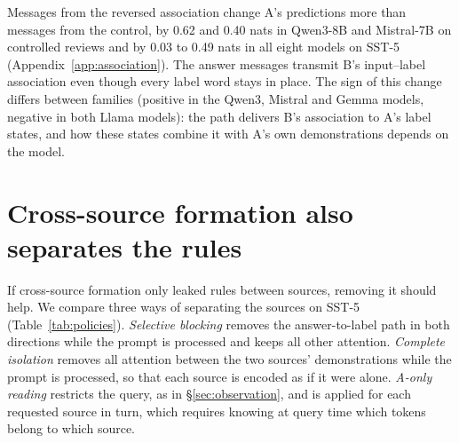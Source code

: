 \documentclass[11pt]{article}
\begin{document}
Messages from the reversed association change A's predictions more than messages from the control, by 0.62 and 0.40 nats in Qwen3-8B and Mistral-7B on controlled reviews and by 0.03 to 0.49 nats in all eight models on SST-5 (Appendix~\ref{app:association}).
The answer messages transmit B's input--label association even though every label word stays in place.
The sign of this change differs between families (positive in the Qwen3, Mistral and Gemma models, negative in both Llama models): the path delivers B's association to A's label states, and how these states combine it with A's own demonstrations depends on the model.

\section{Cross-source formation also separates the rules}
\label{sec:consequences}

If cross-source formation only leaked rules between sources, removing it should help.
We compare three ways of separating the sources on SST-5 (Table~\ref{tab:policies}).
\emph{Selective blocking} removes the answer-to-label path in both directions while the prompt is processed and keeps all other attention.
\emph{Complete isolation} removes all attention between the two sources' demonstrations while the prompt is processed, so that each source is encoded as if it were alone.
\emph{A-only reading} restricts the query, as in \S\ref{sec:observation}, and is applied for each requested source in turn, which requires knowing at query time which tokens belong to which source.
\end{document}
